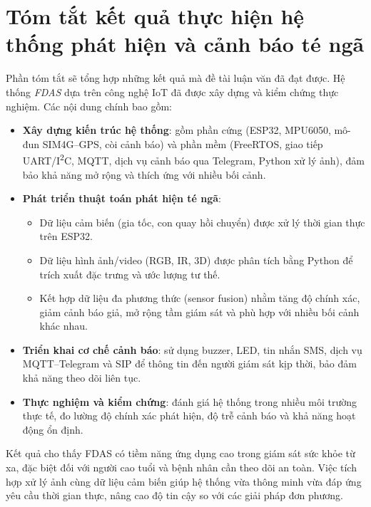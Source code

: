 \section{Tóm tắt kết quả thực hiện hệ thống phát hiện và cảnh báo té ngã}
\label{sec:summary}

Phần tóm tắt sẽ tổng hợp những kết quả mà đề tài luận văn đã đạt được. 
Hệ thống \textit{FDAS} dựa trên công nghệ IoT đã được xây dựng và kiểm chứng thực nghiệm. 
Các nội dung chính bao gồm:  

\begin{itemize}
    \item \textbf{Xây dựng kiến trúc hệ thống}: gồm phần cứng (ESP32, MPU6050, mô-đun SIM4G--GPS, còi cảnh báo) và phần mềm (FreeRTOS, giao tiếp UART/I\textsuperscript{2}C, MQTT, dịch vụ cảnh báo qua Telegram, Python xử lý ảnh), đảm bảo khả năng mở rộng và thích ứng với nhiều bối cảnh.
    
    \item \textbf{Phát triển thuật toán phát hiện té ngã}: 
    \begin{itemize}
        \item Dữ liệu cảm biến (gia tốc, con quay hồi chuyển) được xử lý thời gian thực trên ESP32.
        \item Dữ liệu hình ảnh/video (RGB, IR, 3D) được phân tích bằng Python để trích xuất đặc trưng và ước lượng tư thế.
        \item Kết hợp dữ liệu đa phương thức (sensor fusion) nhằm tăng độ chính xác, giảm cảnh báo giả, mở rộng tầm giám sát và phù hợp với nhiều bối cảnh khác nhau.
    \end{itemize}
    
    \item \textbf{Triển khai cơ chế cảnh báo}: sử dụng buzzer, LED, tin nhắn SMS, dịch vụ MQTT--Telegram và SIP để thông tin đến người giám sát kịp thời, bảo đảm khả năng theo dõi liên tục.
    
    \item \textbf{Thực nghiệm và kiểm chứng}: đánh giá hệ thống trong nhiều môi trường thực tế, đo lường độ chính xác phát hiện, độ trễ cảnh báo và khả năng hoạt động ổn định.
\end{itemize}

Kết quả cho thấy FDAS có tiềm năng ứng dụng cao trong giám sát sức khỏe từ xa, đặc biệt đối với người cao tuổi và bệnh nhân cần theo dõi an toàn. 
Việc tích hợp xử lý ảnh cùng dữ liệu cảm biến giúp hệ thống vừa thông minh vừa đáp ứng yêu cầu thời gian thực, nâng cao độ tin cậy so với các giải pháp đơn phương.
